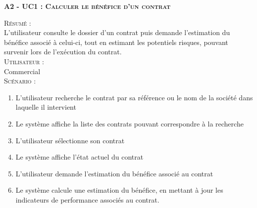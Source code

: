 \noindent\textsc{\bf{A2 - UC1 :} Calculer le bénéfice d’un contrat}
\begin{shaded}
\noindent\textsc{Résumé :}\\

L’utilisateur consulte le dossier d’un contrat puis demande l’estimation du bénéfice associé à celui-ci, tout en estimant les potentiels risques, pouvant survenir lors de l’exécution du contrat. \\

\noindent\textsc{Utilisateur :} \\

Commercial \\

\noindent\textsc{Scénario :} \\
\begin{enumerate}
    \item L’utilisateur recherche le contrat par sa référence ou le nom de la société dans laquelle il intervient
    \item Le système affiche la liste des contrats pouvant correspondre à la recherche
    \item L’utilisateur sélectionne son contrat
    \item Le système affiche l’état actuel du contrat
    \item L’utilisateur demande l’estimation du bénéfice associé au contrat
    \item Le système calcule une estimation du bénéfice, en mettant à jour les indicateurs de performance associés au contrat.
\end{enumerate}
\end{shaded}

